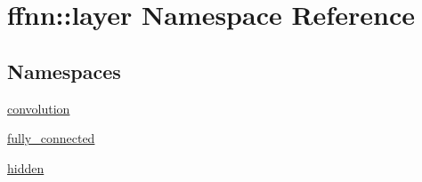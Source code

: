 \hypertarget{namespaceffnn_1_1layer}{\section{ffnn\-:\-:layer Namespace Reference}
\label{namespaceffnn_1_1layer}
}
\subsection*{Namespaces}
\begin{DoxyCompactItemize}
\item 
\hyperlink{namespaceffnn_1_1layer_1_1convolution}{convolution}
\item 
\hyperlink{namespaceffnn_1_1layer_1_1fully__connected}{fully\-\_\-connected}
\item 
\hyperlink{namespaceffnn_1_1layer_1_1hidden}{hidden}
\end{DoxyCompactItemize}
